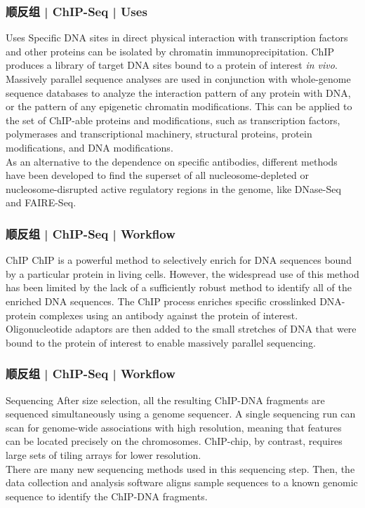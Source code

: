 \begin{frame}
  \frametitle{顺反组 | ChIP-Seq | Uses}
  {\footnotesize
  \begin{block}{Uses}
    Specific DNA sites in direct physical interaction with transcription factors and other proteins can be isolated by chromatin immunoprecipitation. ChIP produces a library of target DNA sites bound to a protein of interest \textit{in vivo}.\\
    \vspace{1em}
    Massively parallel sequence analyses are used in conjunction with whole-genome sequence databases to analyze the interaction pattern of any protein with DNA, or the pattern of any epigenetic chromatin modifications. This can be applied to the set of ChIP-able proteins and modifications, such as transcription factors, polymerases and transcriptional machinery, structural proteins, protein modifications, and DNA modifications.\\
    \vspace{1em}
    As an alternative to the dependence on specific antibodies, different methods have been developed to find the superset of all nucleosome-depleted or nucleosome-disrupted active regulatory regions in the genome, like DNase-Seq and FAIRE-Seq.
  \end{block}
  }
\end{frame}

\begin{frame}
  \frametitle{顺反组 | ChIP-Seq | Workflow}
  \begin{block}{ChIP}
    ChIP is a powerful method to selectively enrich for DNA sequences bound by a particular protein in living cells. However, the widespread use of this method has been limited by the lack of a sufficiently robust method to identify all of the enriched DNA sequences. The ChIP process enriches specific crosslinked DNA-protein complexes using an antibody against the protein of interest. Oligonucleotide adaptors are then added to the small stretches of DNA that were bound to the protein of interest to enable massively parallel sequencing.
  \end{block}
\end{frame}

\begin{frame}
  \frametitle{顺反组 | ChIP-Seq | Workflow}
  \begin{block}{Sequencing}
    After size selection, all the resulting ChIP-DNA fragments are sequenced simultaneously using a genome sequencer. A single sequencing run can scan for genome-wide associations with high resolution, meaning that features can be located precisely on the chromosomes. ChIP-chip, by contrast, requires large sets of tiling arrays for lower resolution.\\
    \vspace{1em}
    There are many new sequencing methods used in this sequencing step. Then, the data collection and analysis software aligns sample sequences to a known genomic sequence to identify the ChIP-DNA fragments.
  \end{block}
\end{frame}


